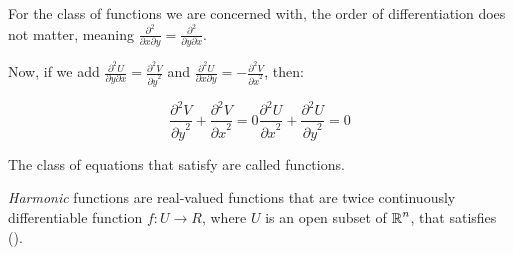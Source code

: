 For the class of functions we are concerned with, the order of differentiation does not matter, meaning $\frac{\partial^{2}}{\partial x \partial y} = \frac{\partial^{2}}{\partial y \partial x}$.

Now, if we add $\frac{\partial^{2} U}{\partial y \partial x} = \frac{\partial^{2} V}{{\partial y}^{2}}$ and $\frac{\partial^{2} U}{\partial x \partial y} = -\frac{\partial^{2} V}{{\partial x}^{2}}$, then:

\begin{subequations}\label{eq:U_V_Harmonic_Relation}
  \begin{equation}\label{subeq:U_V_Harmonic_Relation-V}
    \frac{\partial^{2} V}{{\partial y}^{2}} + \frac{\partial^{2} V}{{\partial x}^{2}} = 0
  \end{equation}
  \begin{equation}\label{subeq:U_V_Harmonic_Relation-U}
    \frac{\partial^{2} U}{{\partial x}^{2}} + \frac{\partial^{2} U}{{\partial y}^{2}} = 0
  \end{equation}
\end{subequations}

The class of equations that satisfy  are called  functions.

\begin{definition}[Harmonic]\label{def:Harmonic}
  \emph{Harmonic} functions are real-valued functions that are twice continuously differentiable function $f: U \to R$, where $U$ is an open subset of $\operatorname{\mathbb{R}}^{n}$, that satisfies~ ().
\end{definition}

